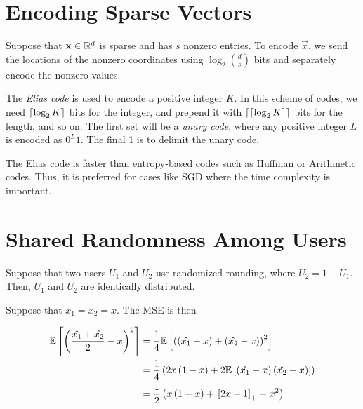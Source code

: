 \documentclass[twoside]{article}
\begin{document}



\section{Encoding Sparse Vectors}

Suppose that \(\boldsymbol{\mathbf{x}}\in\mathbb R^d\) is sparse and has \(s\) nonzero entries. To
encode \(\vec{x}\), we send the locations of the nonzero coordinates using
\(\log_2\binom{d}{s}\) bits and separately encode the nonzero values.

The \emph{Elias code} is used to encode a positive integer \(K\). In this
scheme of codes, we need \(\lceil\log_2 K\rceil\) bits for the integer, and
prepend it with \(\lceil\lceil\log_2 K\rceil\rceil\) bits for the length, and so on.
The first set will be a \emph{unary code}, where any positive integer \(L\)
is encoded as \(0^{L}1\). The final 1 is to delimit the unary code.

The Elias code is faster than entropy-based codes such as Huffman or
Arithmetic codes. Thus, it is preferred for cases like SGD where the time
complexity is important.

\section{Shared Randomness Among Users}

Suppose that two users \(U_1\) and \(U_2\) use randomized rounding, where 
\(U_2 = 1 - U_1\). Then, \(U_1\) and \(U_2\) are identically distributed.

Suppose that \(x_1 = x_2 = x\). The MSE is then

\begin{align}
    \mathbb{E}\left[ \left(\frac{\hat{x_1} + \hat{x_2}}{2}-x\right)^2 \right] &= \frac{1}{4}\mathbb{E}\left[ \left(\left(\hat{x_1}-x\right)+\left(\hat{x_2}-x\right)\right)^2 \right] \\
                                                      &= \frac{1}{4}\left(2x\left(1-x\right)+2\mathbb{E}\left[ \left(\hat{x_1}-x\right)\left(\hat{x_2}-x\right) \right]\right) \\
                                                      &= \frac{1}{2}\left(x\left(1-x\right)+{}\left[2x-1\right]_+ - x^2\right)
                                                      \label{eq:mse-shared-rand}
\end{align}
\end{document}
